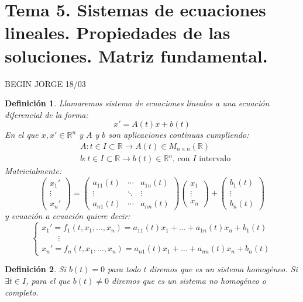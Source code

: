 \documentclass{article}
\theoremstyle{theorem-style}  %
\theoremstyle{definition-style}
\newtheorem{definition}{Definición}[section]
\theoremstyle{example-style}
\begin{document}
\section{Tema 5. Sistemas de ecuaciones lineales. Propiedades de las soluciones. Matriz fundamental.}
BEGIN JORGE 18/03 \\
\begin{definition}
	Llamaremos \emph{sistema de ecuaciones lineales} a una ecuación diferencial de la forma:
	\[x'= A(t)x + b(t)\]
	En el que $ x,x'\in \mathbb{R}^n $ y $A$ y $b$ son aplicaciones continuas cumpliendo:\\
	\begin{align*}
	&A: t \in I \subset \mathbb{R} \longrightarrow A(t) \in M_{n \times n}(\mathbb{R}) \\ 
	&b: t \in I \subset \mathbb{R} \longrightarrow b(t) \in \mathbb{R}^n \text{, con $I$ intervalo}
	\end{align*}
	Matricialmente:
	\[ \begin{pmatrix}
	x_1' \\
	\vdots \\
	x_n'  
	\end{pmatrix} = \begin{pmatrix}
	a_{11}(t) & \cdots & a_{1n}(t) \\
	\vdots & \ddots & \vdots \\
	a_{n1}(t) & \cdots & a_{nn}(t)
	\end{pmatrix} \begin{pmatrix}
	x_1 \\
	\vdots \\
	x_n
	\end{pmatrix} + \begin{pmatrix}
	b_1(t) \\
	\vdots \\
	b_n(t)
	\end{pmatrix}\]
	y ecuación a ecuación quiere decir:
	\[\begin{cases}
	x_1' = f_1(t, x_1, \dots, x_n)=a_{11}(t)x_1+\dots+a_{1n}(t)x_n+b_1(t) \\
	\qquad \vdots \\
	x_n' = f_n(t, x_1, \dots, x_n)=a_{n1}(t)x_1+\dots+a_{nn}(t)x_n+b_n(t) 
	\end{cases}\]
\end{definition}
\begin{definition}
	Si $b(t) = 0$ para todo $ t $ diremos que es un \emph{sistema homogéneo}. Si $\exists t \in I$, para el que $ b(t)\neq0 $ diremos que es un \emph{sistema no homogéneo o completo}.
\end{definition}
\end{document}

